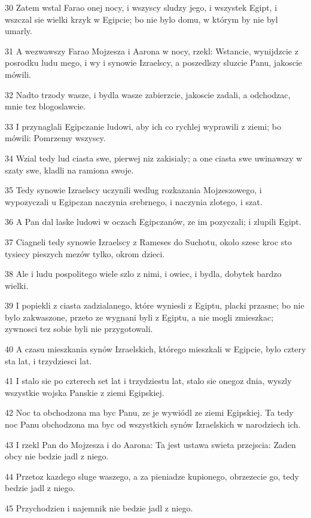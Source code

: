 \par 30 Zatem wstal Farao onej nocy, i wszyscy sludzy jego, i wszystek Egipt, i wszczal sie wielki krzyk w Egipcie; bo nie bylo domu, w którym by nie byl umarly.
\par 31 A wezwawszy Farao Mojzesza i Aarona w nocy, rzekl: Wstancie, wynijdzcie z posrodku ludu mego, i wy i synowie Izraelscy, a poszedlszy sluzcie Panu, jakoscie mówili.
\par 32 Nadto trzody wasze, i bydla wasze zabierzcie, jakoscie zadali, a odchodzac, mnie tez blogoslawcie.
\par 33 I przynaglali Egipczanie ludowi, aby ich co rychlej wyprawili z ziemi; bo mówili: Pomrzemy wszyscy.
\par 34 Wzial tedy lud ciasta swe, pierwej niz zakisialy; a one ciasta swe uwinawszy w szaty swe, kladli na ramiona swoje.
\par 35 Tedy synowie Izraelscy uczynili wedlug rozkazania Mojzeszowego, i wypozyczali u Egipczan naczynia srebrnego, i naczynia zlotego, i szat.
\par 36 A Pan dal laske ludowi w oczach Egipczanów, ze im pozyczali; i zlupili Egipt.
\par 37 Ciagneli tedy synowie Izraelscy z Rameses do Suchotu, okolo szesc kroc sto tysiecy pieszych mezów tylko, okrom dzieci.
\par 38 Ale i ludu pospolitego wiele szlo z nimi, i owiec, i bydla, dobytek bardzo wielki.
\par 39 I popiekli z ciasta zadzialanego, które wyniesli z Egiptu, placki przasne; bo nie bylo zakwaszone, przeto ze wygnani byli z Egiptu, a nie mogli zmieszkac; zywnosci tez sobie byli nie przygotowali.
\par 40 A czasu mieszkania synów Izraelskich, którego mieszkali w Egipcie, bylo cztery sta lat, i trzydziesci lat.
\par 41 I stalo sie po czterech set lat i trzydziestu lat, stalo sie onegoz dnia, wyszly wszystkie wojska Panskie z ziemi Egipskiej.
\par 42 Noc ta obchodzona ma byc Panu, ze je wywiódl ze ziemi Egipskiej. Ta tedy noc Panu obchodzona ma byc od wszystkich synów Izraelskich w narodziech ich.
\par 43 I rzekl Pan do Mojzesza i do Aarona: Ta jest ustawa swieta przejscia: Zaden obcy nie bedzie jadl z niego.
\par 44 Przetoz kazdego sluge waszego, a za pieniadze kupionego, obrzezecie go, tedy bedzie jadl z niego.
\par 45 Przychodzien i najemnik nie bedzie jadl z niego.
